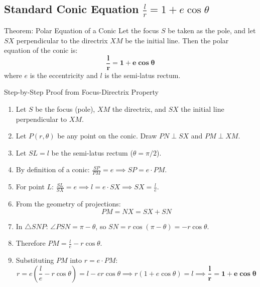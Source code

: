 \documentclass[11pt,a4paper]{article}
\begin{document}
\subsection{Standard Conic Equation \texorpdfstring{$\frac{l}{r} = 1 + e\cos\theta$}{l/r = 1 + e cos theta}}

\begin{defbox}{Theorem: Polar Equation of a Conic}
Let the focus $S$ be taken as the pole, and let $SX$ perpendicular to the directrix $XM$ be the initial line. Then the polar equation of the conic is:
\begin{equation}
    \mathbf{\frac{l}{r} = 1 + e\cos\theta}
\end{equation}
where $e$ is the eccentricity and $l$ is the semi-latus rectum.
\end{defbox}

\begin{exbox}{Step-by-Step Proof from Focus-Directrix Property}
\begin{enumerate}
    \item Let $S$ be the focus (pole), $XM$ the directrix, and $SX$ the initial line perpendicular to $XM$.
    \item Let $P(r, \theta)$ be any point on the conic. Draw $PN \perp SX$ and $PM \perp XM$.
    \item Let $SL = l$ be the semi-latus rectum ($\theta = \pi/2$).
    \item By definition of a conic: $\frac{SP}{PM} = e \implies SP = e \cdot PM$.
    \item For point $L$: $\frac{SL}{SX} = e \implies l = e \cdot SX \implies SX = \frac{l}{e}$.
    \item From the geometry of projections:
    \begin{equation}
        PM = NX = SX + SN
    \end{equation}
    \item In $\triangle SNP$: $\angle PSN = \pi - \theta$, so $SN = r\cos(\pi - \theta) = -r\cos\theta$.
    \item Therefore $PM = \frac{l}{e} - r\cos\theta$.
    \item Substituting $PM$ into $r = e \cdot PM$:
    \begin{equation}
        r = e\left(\frac{l}{e} - r\cos\theta\right) = l - er\cos\theta \implies r(1 + e\cos\theta) = l \implies \mathbf{\frac{l}{r} = 1 + e\cos\theta}
    \end{equation}
\end{enumerate}
\end{exbox}
\end{document}
